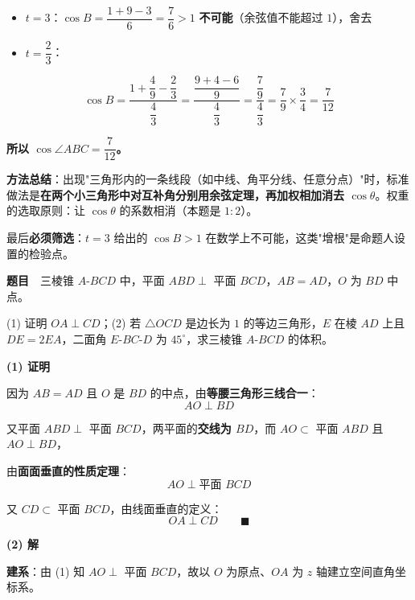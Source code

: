 \begin{itemize}
\item $t=3$：$\cos B=\dfrac{1+9-3}6=\dfrac76>1$  \textbf{不可能}（余弦值不能超过 $1$），舍去
\item $t=\dfrac23$：
\end{itemize}
\[\cos B=\frac{1+\dfrac49-\dfrac23}{\dfrac43}=\frac{\dfrac{9+4-6}9}{\dfrac43}=\frac{\dfrac79}{\dfrac43}=\frac79\times\frac34=\frac7{12}\]

\textbf{所以 $\cos\angle ABC=\dfrac7{12}$。}

\begin{gktip}
\textbf{方法总结}：出现"三角形内的一条线段（如中线、角平分线、任意分点）"时，标准做法是\textbf{在两个小三角形中对互补角分别用余弦定理，再加权相加消去 $\cos\theta$}。权重的选取原则：让 $\cos\theta$ 的系数相消（本题是 $1:2$）。

最后\textbf{必须筛选}：$t=3$ 给出的 $\cos B>1$ 在数学上不可能，这类"增根"是命题人设置的检验点。
\end{gktip}

\par\medskip


\textbf{题目}　三棱锥 $A\text{-}BCD$ 中，平面 $ABD\perp$ 平面 $BCD$，$AB=AD$，$O$ 为 $BD$ 中点。

\begin{center}\end{center}

  (1) 证明 $OA\perp CD$；(2) 若 $\triangle OCD$ 是边长为 $1$ 的等边三角形，$E$ 在棱 $AD$ 上且 $DE=2EA$，二面角 $E\text{-}BC\text{-}D$ 为 $45^\circ$，求三棱锥 $A\text{-}BCD$ 的体积。

\par\medskip

\textbf{(1) 证明}

因为 $AB=AD$ 且 $O$ 是 $BD$ 的中点，由\textbf{等腰三角形三线合一}：
\[AO\perp BD\]

又平面 $ABD\perp$ 平面 $BCD$，两平面的\textbf{交线为 $BD$}，而 $AO\subset$ 平面 $ABD$ 且 $AO\perp BD$，

由\textbf{面面垂直的性质定理}：
\[AO\perp\text{平面 }BCD\]

又 $CD\subset$ 平面 $BCD$，由线面垂直的定义：
\[OA\perp CD\qquad\blacksquare\]

\par\medskip

\textbf{(2) 解}

\textbf{建系}：由 (1) 知 $AO\perp$ 平面 $BCD$，故以 $O$ 为原点、$OA$ 为 $z$ 轴建立空间直角坐标系。

